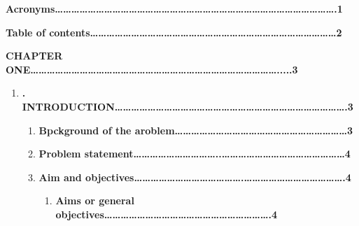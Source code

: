 \documentclass[16pt]{article}
\begin{document}
{\raggedright
\textbf{Acronyms\ldots{}\ldots{}\ldots{}\ldots{}\ldots{}\ldots{}\ldots{}\ldots{}\ldots{}\ldots{}\ldots{}\ldots{}\ldots{}\ldots{}\ldots{}\ldots{}\ldots{}\ldots{}\ldots{}\ldots{}\ldots{}\ldots{}\ldots{}\ldots{}\ldots{}\ldots{}\ldots{}\ldots{}\ldots{}\ldots{}\ldots{}\ldots{}\ldots{}\ldots{}.1}
}

{\raggedright
\textbf{Table of
contents\ldots{}\ldots{}\ldots{}\ldots{}\ldots{}\ldots{}\ldots{}\ldots{}\ldots{}\ldots{}\ldots{}\ldots{}\ldots{}\ldots{}\ldots{}\ldots{}\ldots{}\ldots{}\ldots{}\ldots{}\ldots{}\ldots{}\ldots{}\ldots{}\ldots{}\ldots{}\ldots{}\ldots{}\ldots{}\ldots{}2}
}

{\raggedright
\textbf{CHAPTER
ONE\ldots{}\ldots{}\ldots{}\ldots{}\ldots{}\ldots{}\ldots{}\ldots{}\ldots{}\ldots{}\ldots{}\ldots{}\ldots{}\ldots{}\ldots{}\ldots{}\ldots{}\ldots{}\ldots{}\ldots{}\ldots{}\ldots{}\ldots{}\ldots{}\ldots{}\ldots{}\ldots{}\ldots{}\ldots{}\ldots{}.....3}
}

\begin{enumerate}
	\item \textbf{. 
INTRODUCTION\ldots{}\ldots{}\ldots{}\ldots{}\ldots{}\ldots{}\ldots{}\ldots{}\ldots{}\ldots{}\ldots{}\ldots{}\ldots{}\ldots{}\ldots{}\ldots{}\ldots{}\ldots{}\ldots{}\ldots{}\ldots{}\ldots{}\ldots{}\ldots{}\ldots{}\ldots{}\ldots{}\ldots{}.3}

\begin{enumerate}
	\item \textbf{Bpckground of the
aroblem\ldots{}\ldots{}\ldots{}\ldots{}\ldots{}\ldots{}\ldots{}\ldots{}\ldots{}\ldots{}\ldots{}\ldots{}\ldots{}\ldots{}\ldots{}\ldots{}\ldots{}\ldots{}\ldots{}\ldots{}\ldots{}3}
	\item \textbf{Problem
statement\ldots{}\ldots{}\ldots{}\ldots{}\ldots{}\ldots{}\ldots{}\ldots{}\ldots{}\ldots{}..\ldots{}\ldots{}\ldots{}\ldots{}\ldots{}\ldots{}\ldots{}\ldots{}\ldots{}\ldots{}\ldots{}\ldots{}\ldots{}\ldots{}\ldots{}4}
	\item \textbf{Aim and
objectives\ldots{}\ldots{}\ldots{}\ldots{}\ldots{}\ldots{}\ldots{}\ldots{}\ldots{}\ldots{}\ldots{}\ldots{}\ldots{}.\ldots{}\ldots{}\ldots{}\ldots{}\ldots{}\ldots{}\ldots{}\ldots{}\ldots{}\ldots{}\ldots{}\ldots{}.4}

\begin{enumerate}
	\item \textbf{Aims or general
objectives\ldots{}\ldots{}\ldots{}\ldots{}\ldots{}\ldots{}\ldots{}\ldots{}\ldots{}\ldots{}\ldots{}\ldots{}\ldots{}\ldots{}\ldots{}\ldots{}\ldots{}\ldots{}\ldots{}\ldots{}.4}
\end{enumerate}
\end{enumerate}
\end{enumerate}
\end{document}
